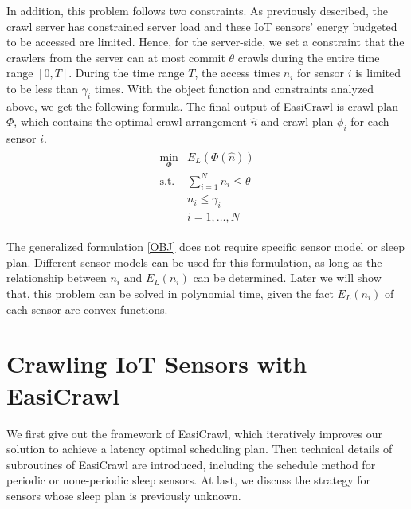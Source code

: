 \documentclass[conference]{IEEEtran}
\begin{document}
In addition, this problem follows two constraints. 
As previously described, the crawl server has constrained server load and these IoT sensors' energy budgeted to be accessed are limited.
Hence, for the server-side, we set a constraint that the crawlers from the server can at most commit $\theta$ crawls during the entire time range $[0,T]$. 
During the time range $T$, the access times $n_i$ for sensor $i$ is limited to be less than $\gamma_i$ times. 
With the object function and constraints analyzed above, we get the following formula.
The final output of EasiCrawl is crawl plan $\Phi$, which contains the optimal crawl arrangement $\hat{n}$ and crawl plan $\phi_i$ for each sensor $i$.
\begin{eqnarray}
\begin{array}{ll}
\min_{\Phi}& E_L(\Phi(\hat{n}))\\
\text{s.t.}
& \sum_{i=1}^{N} n_i \leq\theta\\
&n_i\leq\gamma_i\\
&i=1,\ldots,N
\end{array}\label{OBJ}
\end{eqnarray}

The generalized formulation \eqref{OBJ} does not require specific sensor model or sleep plan. 
Different sensor models can be used for this formulation, as long as the relationship between $n_i$ and $E_L(n_i)$ can be determined.
Later we will show that, this problem can be solved in polynomial time, given the fact $E_L(n_i)$ of each sensor are convex functions.

\section{Crawling IoT Sensors with EasiCrawl} \label{easicrawl}

We first give out the framework of EasiCrawl, which iteratively improves our solution to achieve a latency optimal scheduling plan. 
Then technical details of subroutines of EasiCrawl are introduced, including the schedule method for periodic or none-periodic sleep sensors. 
At last, we discuss the strategy for sensors whose sleep plan is previously unknown.
\end{document}
